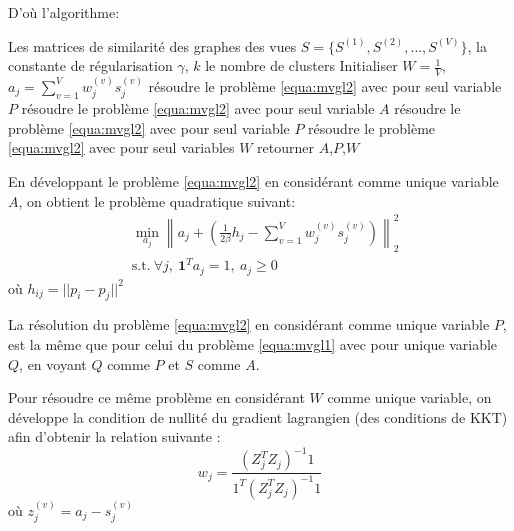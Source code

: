         D'où l'algorithme:
  	  \begin{algorithm}[H]
     	   \caption{Algorithme d'apprentissage du graphe globale \cite{zhan2017graph} }
     	   \label{alg:mcles1}
     	   \begin{algorithmic}[1]
     	   \REQUIRE Les matrices de similarité des graphes des vues $S = \{ S^{(1)}, S^{(2)},\dots,S^{(V)} \}$, la constante de régularisation $\gamma$, $k$ le nombre de clusters
     	   \STATE Initialiser $W = \frac{1}{V}$, $a_j = \sum_{v=1}^V w_j^{(v)}s_j^{(v)}$
 		 \STATE résoudre le problème \ref{equa:mvgl2} avec pour seul variable $P$
     		   \REPEAT
 				   \STATE résoudre le problème \ref{equa:mvgl2} avec pour seul variable $A$
 				   \STATE résoudre le problème \ref{equa:mvgl2} avec pour seul variable $P$
		   	   \STATE résoudre le problème \ref{equa:mvgl2} avec pour seul variables $W$
     	   \ENDWHILE
     	   \STATE retourner $A$,$P$,$W$
     	   \end{algorithmic}
        \end{algorithm}

   	 En développant le problème \ref{equa:mvgl2} en considérant comme unique variable $A$, on obtient le problème quadratique suivant:
   	 \begin{equation}
			\begin{aligned}
				& \min_{a_j} {\left\| a_{j} + \left( \frac{1}{2\beta}h_{j} - \sum_{v=1}^V w_{j}^{(v)}s_{j}^{(v)}  \right) \right\|}_2^2
     		   \\ & \text{s.t.}\ \forall j,\ \textbf{1}^Ta_{j} = 1,\ a_{j}\geq0
     	   \end{aligned}
  	  \end{equation}
		 où $h_{ij} = {|| p_i - p_j ||}^2$
   	 
		 La résolution du problème \ref{equa:mvgl2} en considérant comme unique variable $P$, est la même que pour celui du problème \ref{equa:mvgl1} avec pour unique variable $Q$, en voyant $Q$ comme $P$ et $S$ comme $A$.

		 Pour résoudre ce même problème en considérant $W$ comme unique variable, on développe la condition de nullité du gradient lagrangien (des conditions de KKT) afin d'obtenir la relation suivante :
		 \begin{equation}
			  w_j = \frac{ {\left( Z_{j}^{T}Z_{j} \right)}^{-1} 1 }{ 1^T {\left( Z_{j}^{T}Z_{j} \right)}^{-1} 1}
  	  \end{equation}
   	 où $z_{j}^{(v)} = a_j - s_{j}^{(v)}$
    
